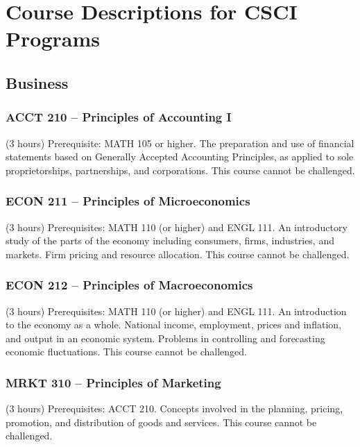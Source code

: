 \section{Course Descriptions for CSCI Programs}

\subsection{Business}
\subsubsection{ACCT 210 -- Principles of Accounting I}%
\label{course:ACCT:210}
(3 hours) Prerequisite: MATH 105 or higher. The preparation and use of financial statements based on Generally Accepted Accounting Principles, as applied to sole proprietorships, partnerships, and corporations. This course cannot be challenged.


\subsubsection{ECON 211 -- Principles of Microeconomics}%
\label{course:ECON:211}
(3 hours) Prerequisites: MATH 110 (or higher) and ENGL 111. An introductory study of the parts of the economy including consumers, firms, industries, and markets. Firm pricing and resource allocation. This course cannot be challenged.

\subsubsection{ECON 212 -- Principles of Macroeconomics}%
\label{course:ECON:212}
(3 hours) Prerequisites: MATH 110 (or higher) and ENGL 111. An introduction to the economy as a whole. National income, employment, prices and inflation, and output in an economic system. Problems in controlling and forecasting economic fluctuations. This course cannot be challenged.

\subsubsection{MRKT 310 -- Principles of Marketing}%
\label{course:MRKT:310}
(3 hours) Prerequisites: ACCT 210. Concepts involved in the planning, pricing, promotion, and distribution of goods and services. This course cannot be challenged.

